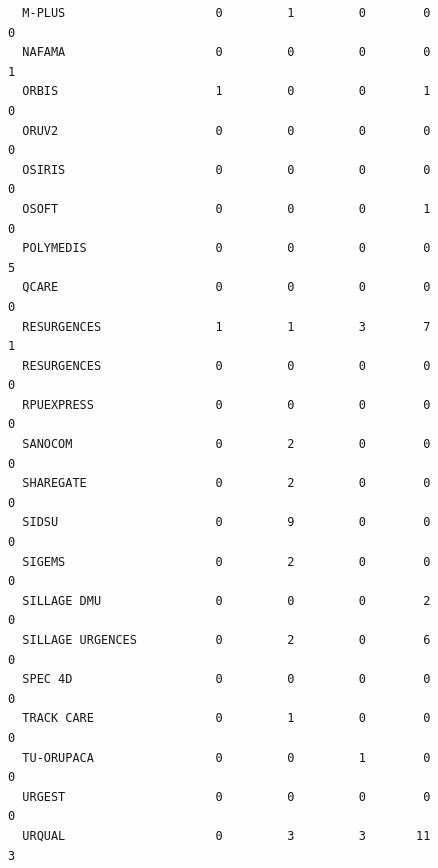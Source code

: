 \documentclass[]{article}
\begin{document}
\begin{verbatim}
  M-PLUS                     0         1         0        0                  0
  NAFAMA                     0         0         0        0                  1
  ORBIS                      1         0         0        1                  0
  ORUV2                      0         0         0        0                  0
  OSIRIS                     0         0         0        0                  0
  OSOFT                      0         0         0        1                  0
  POLYMEDIS                  0         0         0        0                  5
  QCARE                      0         0         0        0                  0
  RESURGENCES                1         1         3        7                  1
  RESURGENCES                0         0         0        0                  0
  RPUEXPRESS                 0         0         0        0                  0
  SANOCOM                    0         2         0        0                  0
  SHAREGATE                  0         2         0        0                  0
  SIDSU                      0         9         0        0                  0
  SIGEMS                     0         2         0        0                  0
  SILLAGE DMU                0         0         0        2                  0
  SILLAGE URGENCES           0         2         0        6                  0
  SPEC 4D                    0         0         0        0                  0
  TRACK CARE                 0         1         0        0                  0
  TU-ORUPACA                 0         0         1        0                  0
  URGEST                     0         0         0        0                  0
  URQUAL                     0         3         3       11                  3
                       

\end{verbatim}
\end{document}
